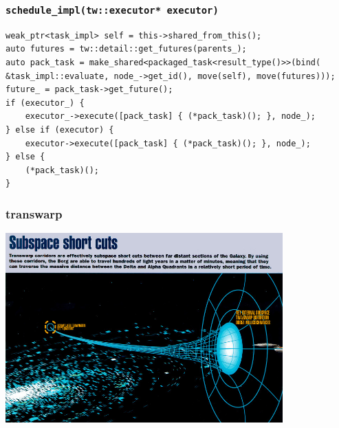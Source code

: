 \documentclass[12pt,aspectratio=169]{beamer}
\begin{document}
\begin{frame}[fragile]
\frametitle{\lstinline{schedule_impl(tw::executor* executor)}}
\begin{lstlisting}
weak_ptr<task_impl> self = this->shared_from_this();
auto futures = tw::detail::get_futures(parents_);
auto pack_task = make_shared<packaged_task<result_type()>>(bind( &task_impl::evaluate, node_->get_id(), move(self), move(futures)));
future_ = pack_task->get_future();
if (executor_) {
    executor_->execute([pack_task] { (*pack_task)(); }, node_);
} else if (executor) {
    executor->execute([pack_task] { (*pack_task)(); }, node_);
} else {
    (*pack_task)();
}
\end{lstlisting}
\end{frame}

\begin{frame}[fragile]
\frametitle{transwarp}
\begin{center}
\includegraphics[width=0.8\textwidth]{img/transwarp_conduit}
\end{center}
\end{frame}
\end{document}
